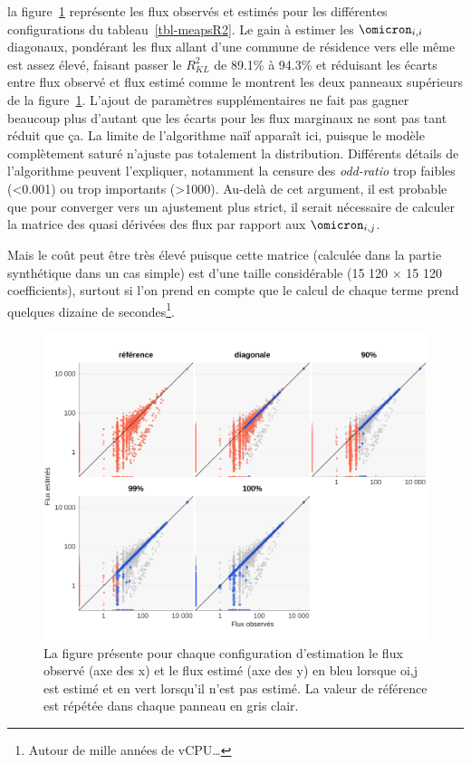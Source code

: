 \documentclass[
  10pt,
  a4paper,
  numbers=noendperiod,
  DIV=12]{scrartcl}
\begin{document}
la figure~\ref{fig-actvsfit} représente les flux observés et estimés
pour les différentes configurations du tableau~\ref{tbl-meapsR2}. Le
gain à estimer les \(\omicron_{i,i}\) diagonaux, pondérant les flux
allant d'une commune de résidence vers elle même est assez élevé,
faisant passer le \(R^2_{KL}\) de 89.1\% à 94.3\% et réduisant les
écarts entre flux observé et flux estimé comme le montrent les deux
panneaux supérieurs de la figure~\ref{fig-actvsfit}. L'ajout de
paramètres supplémentaires ne fait pas gagner beaucoup plus d'autant que
les écarts pour les flux marginaux ne sont pas tant réduit que ça. La
limite de l'algorithme naïf apparaît ici, puisque le modèle complètement
saturé n'ajuste pas totalement la distribution. Différents détails de
l'algorithme peuvent l'expliquer, notamment la censure des
\emph{odd-ratio} trop faibles (\textless0.001) ou trop importants
(\textgreater1000). Au-delà de cet argument, il est probable que pour
converger vers un ajustement plus strict, il serait nécessaire de
calculer la matrice des quasi dérivées des flux par rapport aux
\(\omicron_{i,j}\).

Mais le coût peut être très élevé puisque cette matrice (calculée dans
la partie synthétique dans un cas simple) est d'une taille considérable
(15 120 \(\times\) 15 120 coefficients), surtout si l'on prend en compte
que le calcul de chaque terme prend quelques dizaine de
secondes\footnote{Autour de mille années de vCPU\ldots{}}.

\begin{figure}[htb]

{\centering \includegraphics[width=1\textwidth,height=\textheight]{output/estmeaps.png}

}

\caption[MEAPS observés versus estimés]{\label{fig-actvsfit}La figure
présente pour chaque configuration d'estimation le flux observé (axe des
x) et le flux estimé (axe des y) en bleu lorsque oi,j est estimé et en
vert lorsqu'il n'est pas estimé. La valeur de référence est répétée dans
chaque panneau en gris clair.}

\end{figure}
\end{document}
